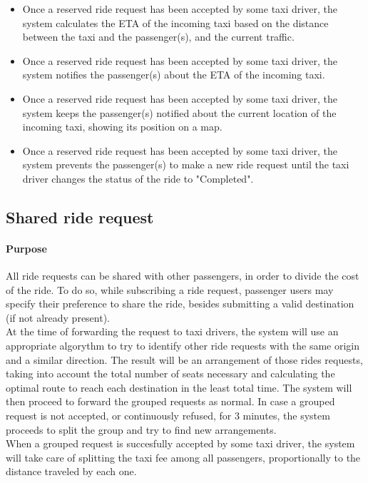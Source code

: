 \begin{itemize}
	\item Once a reserved ride request has been accepted by some taxi driver, the system calculates the ETA of the incoming taxi based on the distance between the taxi and the passenger(s), and the current traffic.
	
	\item Once a reserved ride request has been accepted by some taxi driver, the system notifies the passenger(s) about the ETA of the incoming taxi.
	
	\item Once a reserved ride request has been accepted by some taxi driver, the system keeps the passenger(s) notified about the current location of the incoming taxi, showing its position on a map.
	
	\item Once a reserved ride request has been accepted by some taxi driver, the system prevents the passenger(s) to make a new ride request until the taxi driver changes the status of the ride to "Completed".
\end{itemize}

\subsection{Shared ride request}

\paragraph{Purpose}
	All ride requests can be shared with other passengers, in order to divide the cost of the ride. To do so, while subscribing a ride request, passenger users may specify their preference to share the ride, besides submitting a valid destination (if not already present).\\
		At the time of forwarding the request to taxi drivers, the system will use an appropriate algorythm to try to identify other ride requests with the same origin and a similar direction. The result will be an arrangement of those rides requests, taking into account the total number of seats necessary and calculating the optimal route to reach each destination in the least total time. The system will then proceed to forward the grouped requests as normal. In case a grouped request is not accepted, or continuously refused, for 3 minutes, the system proceeds to split the group and try to find new arrangements.\\
		When a grouped request is succesfully accepted by some taxi driver, the system will take care of splitting the taxi fee among all passengers, proportionally to the distance traveled by each one.
		
